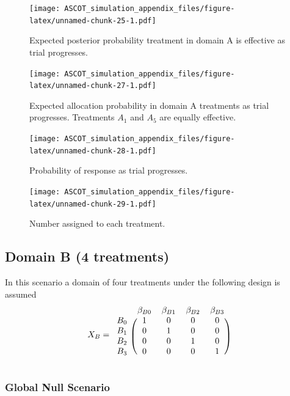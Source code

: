 \documentclass[
]{article}
\begin{document}
\begin{figure}
\centering
\texttt{[image: ASCOT\_simulation\_appendix\_files/figure-latex/unnamed-chunk-25-1.pdf]}
\caption{\label{fig:unnamed-chunk-25}Expected posterior probability treatment in domain A is effective as trial progresses.}
\end{figure}

\begin{figure}
\centering
\texttt{[image: ASCOT\_simulation\_appendix\_files/figure-latex/unnamed-chunk-27-1.pdf]}
\caption{\label{fig:unnamed-chunk-27}Expected allocation probability in domain A treatments as trial progresses. Treatments \(A_1\) and \(A_5\) are equally effective.}
\end{figure}

\begin{figure}
\centering
\texttt{[image: ASCOT\_simulation\_appendix\_files/figure-latex/unnamed-chunk-28-1.pdf]}
\caption{\label{fig:unnamed-chunk-28}Probability of response as trial progresses.}
\end{figure}

\begin{figure}
\centering
\texttt{[image: ASCOT\_simulation\_appendix\_files/figure-latex/unnamed-chunk-29-1.pdf]}
\caption{\label{fig:unnamed-chunk-29}Number assigned to each treatment.}
\end{figure}

\clearpage

\hypertarget{domain-b-4-treatments}{%
\subsection{Domain B (4 treatments)}\label{domain-b-4-treatments}}

In this scenario a domain of four treatments under the following design is assumed
\[
 X_{B} = 
\begin{blockarray}{ccccc}
          & \beta_{B0} & \beta_{B1} & \beta_{B2} & \beta_{B3} \\
\begin{block}{r(cccc)}
      B_0 & 1 & 0 & 0 & 0 \\
      B_1 & 0 & 1 & 0 & 0 \\
      B_2 & 0 & 0 & 1 & 0 \\
      B_3 & 0 & 0 & 0 & 1 \\
\end{block}
\end{blockarray}
\]

\hypertarget{global-null-scenario-1}{%
\subsubsection{Global Null Scenario}\label{global-null-scenario-1}}
\end{document}
